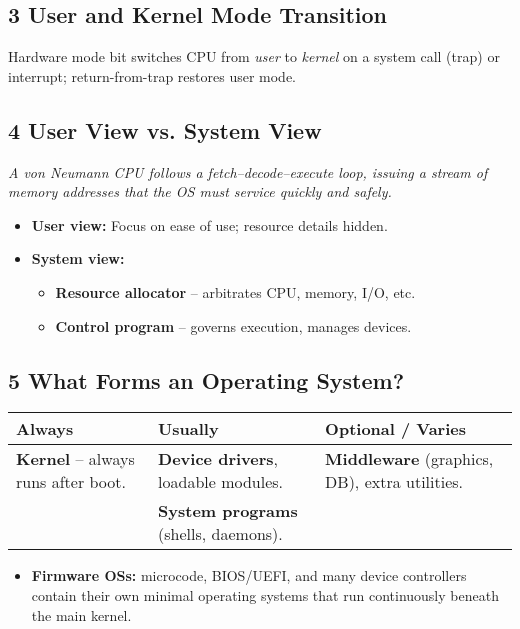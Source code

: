 \documentclass{article}
\begin{document}
\subsection*{3 User and Kernel Mode Transition}
Hardware mode bit switches CPU from \emph{user} to \emph{kernel} on a
system call (trap) or interrupt; return-from-trap restores user mode.

\subsection*{4 User View vs. System View}
\textit{A von Neumann CPU follows a fetch–decode–execute loop, issuing a
stream of memory addresses that the OS must service quickly and safely.}

\begin{itemize}
    \item \textbf{User view:} Focus on ease of use; resource details hidden.
    \item \textbf{System view:}
    \begin{itemize}
        \item \textbf{Resource allocator} – arbitrates CPU, memory, I/O, etc.
        \item \textbf{Control program} – governs execution, manages devices.
    \end{itemize}
\end{itemize}

\subsection*{5 What Forms an Operating System?}
\centering
\begin{tabular}{>{\raggedright}p{} >{\raggedright}p{} >{\raggedright\arraybackslash}p{}}
\toprule
\textbf{Always} & \textbf{Usually} & \textbf{Optional / Varies} \\
\midrule
\textbf{Kernel} – always runs after boot. & \textbf{Device drivers}, loadable modules. & \textbf{Middleware} (graphics, DB), extra utilities. \\
& \textbf{System programs} (shells, daemons). & \\
\bottomrule
\end{tabular}
\vspace{\baselineskip} %
\begin{itemize}
    \item \textbf{Firmware OSs:} microcode, BIOS/UEFI, and many device
    controllers contain their own minimal operating systems that run
    continuously beneath the main kernel.
\end{itemize}
\end{document}
